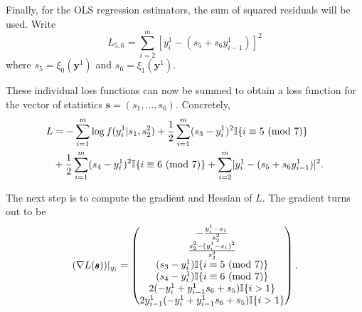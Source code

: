 Finally, for the OLS regression estimators, the sum of squared residuals will be used. Write
\begin{equation}
    L_{5,6} = \sum_{i=2}^m [y^1_i - (s_5 + s_6 y^1_{i-1})]^2
\end{equation}
where $s_5 = \xi_0(\pmb{y}^1)$ and $s_6 = \xi_1(\pmb{y}^1)$.

These individual loss functions can now be summed to obtain a loss function for the vector of statistics $\pmb{s} = (s_1, \ldots, s_6)$. Concretely,
\begin{equation}
    \begin{split}
        L &= -\sum_{i=1}^m \log{f(y^1_i | s_1, s_2^2)} + \frac{1}{2}\sum_{i=1}^m (s_3 - y^1_i)^2 \mathbb{I}\{i \equiv 5 \ (\mathrm{mod}\ 7)\} \\ &+ \frac{1}{2}\sum_{i=1}^m (s_4 - y^1_i)^2 \mathbb{I}\{i \equiv 6 \ (\mathrm{mod}\ 7)\} + \sum_{i=2}^m [y^1_i - (s_5 + s_6 y^1_{i-1})]^2.
    \end{split}
\end{equation}

The next step is to compute the gradient and Hessian of $L$. The gradient turns out to be
\begin{equation}
    (\nabla L(\pmb{s}))|_{y_i} =
    \begin{pmatrix}
        - \frac{y^1_i - s_1}{s_2^2} \\
        \frac{s_2^2 - (y^1_i - s_1)^2}{s_2^3} \\
        (s_3 - y^1_i)\mathbb{I}\{i \equiv 5 \ (\mathrm{mod}\ 7)\} \\
        (s_4 - y^1_i)\mathbb{I}\{i \equiv 6 \ (\mathrm{mod}\ 7)\} \\
        2(-y^1_i + y^1_{i-1}s_6 + s_5)\mathbb{I}\{i > 1\} \\
        2y^1_{i-1}(-y^1_i + y^1_{i-1}s_6 + s_5)\mathbb{I}\{i > 1\}
    \end{pmatrix}.
\end{equation}

